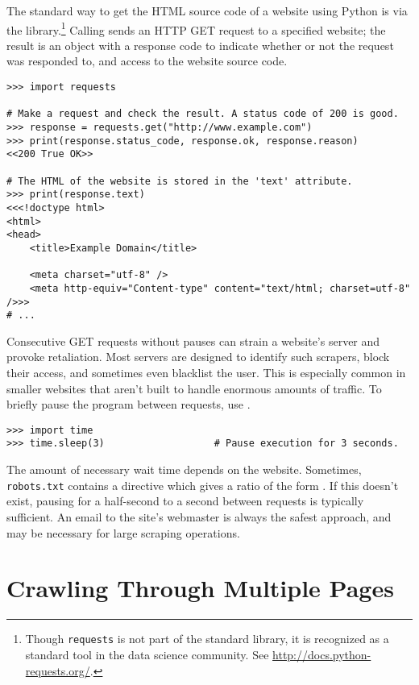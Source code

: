 The standard way to get the HTML source code of a website using Python is via the  library.\footnote{Though \texttt{requests} is not part of the standard library, it is recognized as a standard tool in the data science community. See \url{http://docs.python-requests.org/}.}
Calling  sends an HTTP GET request to a specified website; the result is an object with a response code to indicate whether or not the request was responded to, and access to the website source code.

\begin{lstlisting}
>>> import requests

# Make a request and check the result. A status code of 200 is good.
>>> response = requests.get("http://www.example.com")
>>> print(response.status_code, response.ok, response.reason)
<<200 True OK>>

# The HTML of the website is stored in the 'text' attribute.
>>> print(response.text)
<<<!doctype html>
<html>
<head>
    <title>Example Domain</title>

    <meta charset="utf-8" />
    <meta http-equiv="Content-type" content="text/html; charset=utf-8" />>>
# ...
\end{lstlisting}

\begin{warn} %
Consecutive GET requests without pauses can strain a website's server and provoke retaliation.
Most servers are designed to identify such scrapers, block their access, and sometimes even blacklist the user.
This is especially common in smaller websites that aren't built to handle enormous amounts of traffic.
To briefly pause the program between requests, use .
\begin{lstlisting}
>>> import time
>>> time.sleep(3)                   # Pause execution for 3 seconds.
\end{lstlisting}

The amount of necessary wait time depends on the website.
Sometimes, \texttt{robots.txt} contains a  directive which gives a ratio of the form .
If this doesn't exist, pausing for a half-second to a second between requests is typically sufficient.
An email to the site's webmaster is always the safest approach, and may be necessary for large scraping operations.
\end{warn}

\section*{Crawling Through Multiple Pages} %

